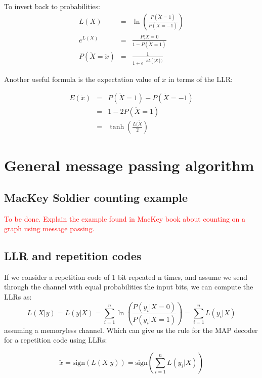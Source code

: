 To invert back to probabilities:
\begin{eqnarray}
	L(X) &=& \ln\left(\frac{P(\ddot{X} = 1)}{P(\ddot{X} = -1)}\right) \nonumber \\
	e^{L(X)} &=& \frac{P(\ddot{X}=0}{1-P(\ddot{X}=1)} \nonumber \\
	P(\ddot{X} = \ddot{x}) &=& \frac{1}{1+e^{-\ddot{x}L(\ddot(X))}}
\end{eqnarray}

Another useful formula is the expectation value of $\ddot{x}$ in terms of the LLR:

\begin{eqnarray} \label{eq:expectationLLR}
	E(\ddot{x}) &=&  P(\ddot{X}=1) - P(\ddot{X}=-1) \nonumber \\
	 &=&  1 - 2P(\ddot{X}=1) \nonumber \\
	 &=& \tanh\left(\frac{L(\ddot{X}}{2}\right)
\end{eqnarray}

\section{General message passing algorithm}

\subsection{MacKey Soldier counting example}
\textcolor{red}{To be done. Explain the example found in MacKey book about counting on a graph using message passing.}

\subsection{LLR and repetition codes}

If we consider a repetition code of 1 bit repeated n times, and assume we send through the channel with equal probabilities the input bits, we can compute the LLRs as:
\begin{equation}
	L(X|y) = L(y|X) = \sum_{i=1}^n \ln \left(\frac{P(y_i|X=0)}{P(y_i|X=1)}\right) = \sum_{i=1}^n L(y_i|X)
\end{equation}
assuming a memoryless channel. Which can give us the rule for the MAP decoder for a repetition code using LLRs:

\begin{equation}
\ddot{x} = \text{sign} (L(X|y)) = \text{sign}\left(\sum_{i=1}^n L(y_i|X)\right)
\end{equation}


